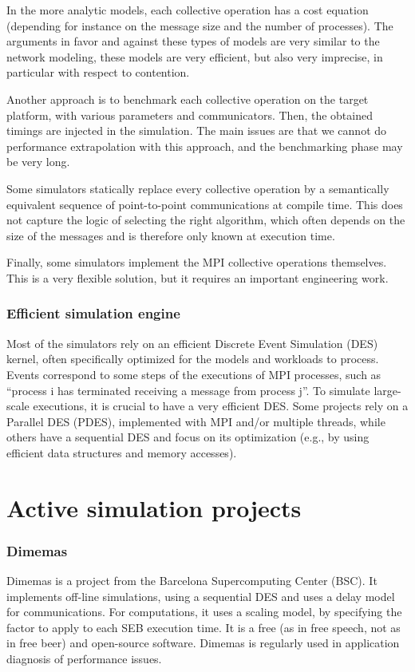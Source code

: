 \documentclass[12pt, a4paper]{memoir}
\begin{document}
In the more analytic models, each collective operation has a cost equation (depending for instance on the message
size and the number of processes). The arguments in favor and against these types of models are very similar to the
network modeling, these models are very efficient, but also very imprecise, in particular with respect to
contention.

Another approach is to benchmark each collective operation on the target platform, with various parameters and
communicators.  Then, the obtained timings are injected in the simulation. The main issues are that we cannot do
performance extrapolation with this approach, and the benchmarking phase may be very long.

Some simulators statically replace every collective operation by a semantically equivalent sequence of
point-to-point communications at compile time. This does not capture the logic of selecting the right algorithm,
which often depends on the size of the messages and is therefore only known at execution time.

Finally, some simulators implement the MPI collective operations themselves. This is a very flexible solution, but
it requires an important engineering work.
\subsubsection{Efficient simulation engine}
\label{sec:org58c98bb}
Most of the simulators rely on an efficient Discrete Event Simulation (DES) kernel, often specifically optimized
for the models and workloads to process. Events correspond to some steps of the executions of MPI processes, such
as “process i has terminated receiving a message from process j”.  To simulate large-scale executions, it is
crucial to have a very efficient DES. Some projects rely on a Parallel DES (PDES), implemented with MPI and/or
multiple threads, while others have a sequential DES and focus on its optimization (e.g., by using efficient data
structures and memory accesses).
\section{Active simulation projects}
\label{sec:orgbd107bb}
\subsubsection{Dimemas}
\label{sec:orge04b727}
Dimemas\cite{dimemas} is a project from the Barcelona Supercomputing Center (BSC). It implements off-line simulations,
using a sequential DES and uses a delay model for communications. For computations, it uses a scaling model, by
specifying the factor to apply to each SEB execution time. It is a free (as in free speech, not as in free beer)
and open-source software. Dimemas is regularly used in application diagnosis of performance issues.
\end{document}
